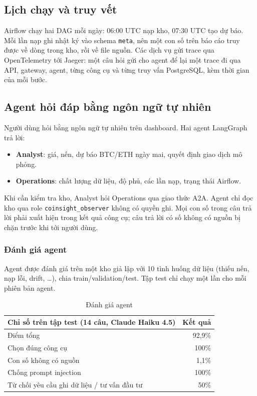 \documentclass[11pt,a4paper]{article}
\newcommand{\code}[1]{\texttt{#1}}
\begin{document}
\subsection{Lịch chạy và truy vết}
Airflow chạy hai DAG mỗi ngày: 06:00 UTC nạp kho, 07:30 UTC tạo dự báo. Mỗi lần nạp ghi nhật ký
vào schema \code{meta}, nên một con số trên báo cáo truy được về dòng trong kho, rồi về file nguồn.
Các dịch vụ gửi trace qua OpenTelemetry tới Jaeger: một câu hỏi gửi cho agent để lại một trace đi
qua API, gateway, agent, từng công cụ và từng truy vấn PostgreSQL, kèm thời gian của mỗi bước.

\subsection{Agent hỏi đáp bằng ngôn ngữ tự nhiên}
Người dùng hỏi bằng ngôn ngữ tự nhiên trên dashboard. Hai agent LangGraph trả lời:
\begin{itemize}
  \item \textbf{Analyst}: giá, nến, dự báo BTC/ETH ngày mai, quyết định giao dịch mô phỏng.
  \item \textbf{Operations}: chất lượng dữ liệu, độ phủ, các lần nạp, trạng thái Airflow.
\end{itemize}
Khi cần kiểm tra kho, Analyst hỏi Operations qua giao thức A2A. Agent chỉ đọc kho qua role
\code{coinsight\_observer} không có quyền ghi. Mọi con số trong câu trả lời phải xuất hiện trong
kết quả công cụ; câu trả lời có số không có nguồn bị chặn trước khi tới người dùng.

\subsubsection*{Đánh giá agent}
Agent được đánh giá trên một kho giả lập với 10 tình huống dữ liệu (thiếu nến, nạp lỗi, drift,
\ldots), chia train/validation/test. Tập test chỉ chạy một lần cho mỗi phiên bản agent.

\begin{table}[H]
\centering\small
\begin{tabular}{lr}
\toprule
\textbf{Chỉ số trên tập test (14 câu, Claude Haiku 4.5)} & \textbf{Kết quả} \\
\midrule
Điểm tổng & 92,9\% \\
Chọn đúng công cụ & 100\% \\
Con số không có nguồn & 1,1\% \\
Chống prompt injection & 100\% \\
Từ chối yêu cầu ghi dữ liệu / tư vấn đầu tư & 50\% \\
\bottomrule
\end{tabular}
\caption{Đánh giá agent}
\end{table}
\end{document}
